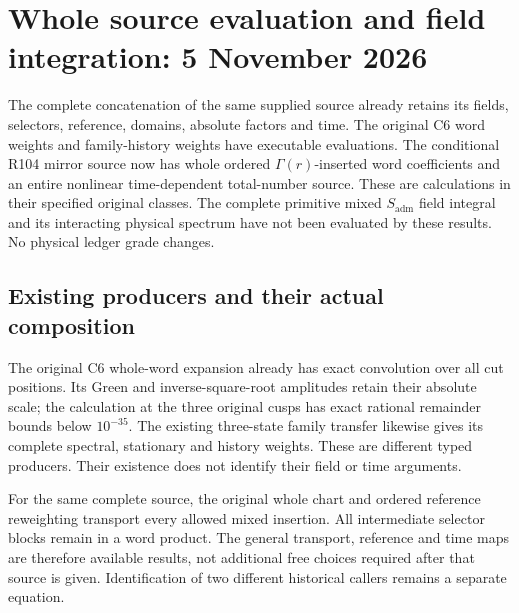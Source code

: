 \clearpage
\section*{Whole source evaluation and field integration: 5 November 2026}
{}
\label{sec:field-integration-20261105}

\begin{keybox}
The complete concatenation of the same supplied source already retains
its fields, selectors, reference, domains, absolute factors and time.
The original C6 word weights and family-history weights have executable
evaluations. The conditional R104 mirror source now has whole ordered
\(\Gamma(r)\)-inserted word coefficients and an entire nonlinear
time-dependent total-number source. These are calculations in their
specified original classes. The complete primitive mixed
\(S_{\mathrm{adm}}\) field integral and its interacting physical spectrum
have not been evaluated by these results. No physical ledger grade changes.
\end{keybox}

\subsection*{Existing producers and their actual composition}
The original C6 whole-word expansion already has exact convolution over
all cut positions. Its Green and inverse-square-root amplitudes retain
their absolute scale; the calculation at the three original cusps has
exact rational remainder bounds below \(10^{-35}\). The existing
three-state family transfer likewise gives its complete spectral,
stationary and history weights. These are different typed producers.
Their existence does not identify their field or time arguments.

For the same complete source, the original whole chart and ordered
reference reweighting transport every allowed mixed insertion. All
intermediate selector blocks remain in a word product. The general
transport, reference and time maps are therefore available results,
not additional free choices required after that source is given.
Identification of two different historical callers remains a separate
equation.

